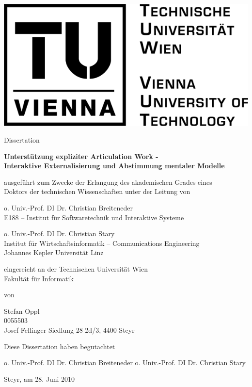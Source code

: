 \begin{titlepage}
	{
	\centering

	\includegraphics[width=.25\textwidth]{img/tu_logo.png}

	\vspace{1cm}

	\Large Dissertation
	
	\vspace{0.5cm}
	
	\textsf{
	\Large \textbf{Unterstützung expliziter Articulation Work -}\\	
	\large \textbf{Interaktive Externalisierung und Abstimmung mentaler Modelle}
	}

	\vspace{1cm}
	
	\normalsize ausgeführt zum Zwecke der Erlangung des akademischen Grades eines\\Doktors der technischen Wissenschaften unter der Leitung von

	\vspace{0.2cm}
	
	o. Univ.-Prof. DI Dr. Christian Breiteneder\\\small E188 -- Institut für Softwaretechnik und Interaktive Systeme

	\vspace{0.2cm}

	\normalsize o. Univ.-Prof. DI Dr. Christian Stary\\\small Institut für Wirtschaftsinformatik -- Communications Engineering\\Johannes Kepler Universität Linz

	\vspace{0.4cm}

	\normalsize eingereicht an der Technischen Universität Wien\\Fakultät für Informatik

	\vspace{0.5cm}

	von

	\vspace{0.2cm}

	Stefan Oppl\\\small 0055503\\Josef-Fellinger-Siedlung 28 2d/3, 4400 Steyr
	
	\vspace{0.8cm}
	
	\normalsize Diese Dissertation haben begutachtet
	
	\vspace{1cm}
	\small o. Univ.-Prof. DI Dr. Christian Breiteneder \hspace{1cm} o. Univ.-Prof. DI Dr. Christian Stary

	\vspace{1.3cm}
	}
	\normalsize Steyr, am 28. Juni 2010
	
\end{titlepage}